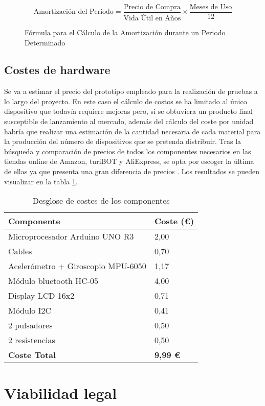 \begin{figure}[h]
    \centering
    \[
    \text{Amortización del Periodo} = \frac{\text{Precio de Compra}}{\text{Vida Útil en Años}} \times \frac{\text{Meses de Uso}}{12}
    \]
    \caption{Fórmula para el Cálculo de la Amortización durante un Periodo Determinado}
    \label{fig:amortizacion-portatil}
\end{figure}

\subsection{Costes de hardware}
Se va a estimar el precio del prototipo empleado para la realización de pruebas a lo largo del proyecto. En este caso el cálculo de costos se ha limitado al único dispositivo que todavía requiere mejoras pero, si se obtuviera un producto final susceptible de lanzamiento al mercado, además del cálculo del coste por unidad habría que realizar una estimación de la cantidad necesaria de cada material para la producción del número de dispositivos que se pretenda distribuir.
Tras la búsqueda y comparación de precios de todos los componentes necesarios en las tiendas online de Amazon, turiBOT y AliExpress, se opta por escoger la última de ellas ya que presenta una gran diferencia de precios \cite{AliExpre51:online}. Los resultados se pueden visualizar en la tabla \ref{tab:costesComponentes}.

\begin{table}[]
    \centering
    \begin{tabular}{ll}
        \hline
        \rowcolor[HTML]{FFFFFF} 
        \textbf{Componente} & \textbf{Coste (€)} \\ \hline
        \rowcolor[HTML]{EFEFEF} 
        Microprocesador Arduino UNO R3 & 2,00 \\ \hline
        \rowcolor[HTML]{FFFFFF} 
        Cables & 0,70 \\ \hline
        \rowcolor[HTML]{EFEFEF} 
        Acelerómetro + Giroscopio MPU-6050 & 1,17 \\ \hline
        \rowcolor[HTML]{FFFFFF} 
        Módulo bluetooth HC-05 & 4,00 \\ \hline
        \rowcolor[HTML]{EFEFEF} 
        Display LCD 16x2 & 0,71 \\ \hline
        \rowcolor[HTML]{FFFFFF} 
        Módulo I2C & 0,41 \\ \hline
        \rowcolor[HTML]{EFEFEF} 
        2 pulsadores & 0,50 \\ \hline
        \rowcolor[HTML]{FFFFFF} 
        2 resistencias & 0,50 \\ \hline
        \rowcolor[HTML]{C0C0C0} 
        \textbf{Coste Total} & \textbf{9,99 €} \\ \hline
    \end{tabular}
    \caption{Desglose de costes de los componentes}
    \label{tab:costesComponentes}
\end{table}






\section{Viabilidad legal}


